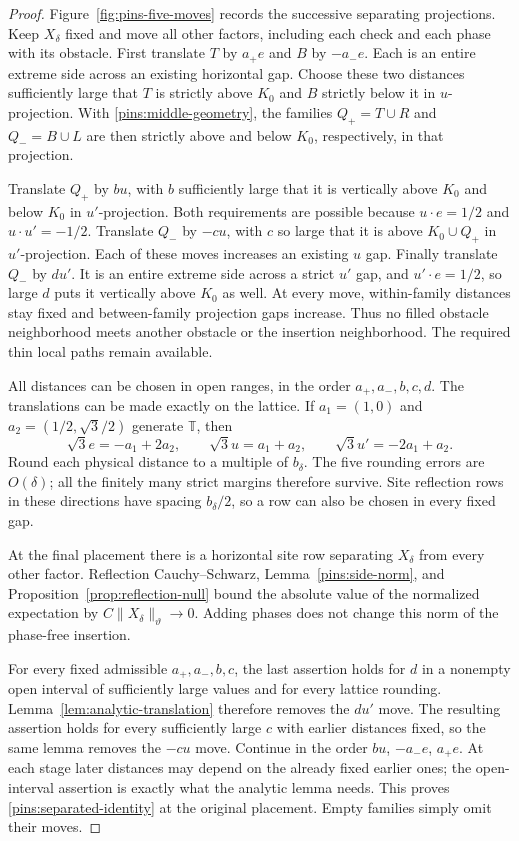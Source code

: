 \documentclass[11pt]{article}
\newcommand{\T}{\mathbb T}
\theoremstyle{definition}
\theoremstyle{remark}
\numberwithin{equation}{section}
\begin{document}
\begin{proof}
Figure~\ref{fig:pins-five-moves} records the successive separating
projections.  Keep $X_\delta$ fixed and move all other factors, including
each check and each phase with its obstacle.  First translate $T$ by $a_+e$ and
$B$ by $-a_-e$.  Each is an entire extreme side across an existing
horizontal gap.  Choose these two distances sufficiently large that
$T$ is strictly above $K_0$ and $B$ strictly below it in
$u$-projection.  With \eqref{pins:middle-geometry}, the families
$Q_+=T\cup R$ and $Q_-=B\cup L$ are then strictly above and below
$K_0$, respectively, in that projection.

Translate $Q_+$ by $bu$, with $b$ sufficiently large that it is
vertically above $K_0$ and below $K_0$ in $u'$-projection.  Both
requirements are possible because
$u\cdot e=1/2$ and $u\cdot u'=-1/2$.  Translate $Q_-$ by $-cu$,
with $c$ so large that it is above $K_0\cup Q_+$ in
$u'$-projection.  Each of these moves increases an existing $u$ gap.
Finally translate $Q_-$ by $du'$.  It is an entire extreme side
across a strict $u'$ gap, and $u'\cdot e=1/2$, so large $d$ puts
it vertically above $K_0$ as well.  At every move, within-family
distances stay fixed and between-family projection gaps increase.
Thus no filled obstacle neighborhood meets another obstacle or the
insertion neighborhood.  The required thin local paths remain available.

All distances can be chosen in open ranges, in the order
$a_+,a_-,b,c,d$.  The translations can be made exactly on the lattice.
If $a_1=(1,0)$ and $a_2=(1/2,\sqrt3/2)$ generate $\T$, then
\[
 \sqrt3 e=-a_1+2a_2,\qquad
 \sqrt3 u=a_1+a_2,\qquad
 \sqrt3 u'=-2a_1+a_2.
\]
Round each physical distance to a multiple of $b_\delta$.  The five
rounding errors are $O(\delta)$; all the finitely many strict margins
therefore survive.  Site reflection rows in these directions have
spacing $b_\delta/2$, so a row can also be chosen in every fixed gap.

At the final placement there is a horizontal site row separating
$X_\delta$ from every other factor.  Reflection Cauchy--Schwarz,
Lemma~\ref{pins:side-norm}, and
Proposition~\ref{prop:reflection-null} bound the absolute value of
the normalized expectation by $C\|X_\delta\|_\vartheta\to0$.
Adding phases does not change this norm of the phase-free insertion.

For every fixed admissible $a_+,a_-,b,c$, the last assertion holds
for $d$ in a nonempty open interval of sufficiently large values and
for every lattice rounding.  Lemma~\ref{lem:analytic-translation}
therefore removes the $du'$ move.  The resulting assertion holds for
every sufficiently large $c$ with earlier distances fixed, so the same
lemma removes the $-cu$ move.  Continue in the order $bu$, $-a_-e$,
$a_+e$.  At each stage later distances may depend on the already fixed
earlier ones; the open-interval assertion is exactly what the analytic
lemma needs.  This proves \eqref{pins:separated-identity} at the original
placement.  Empty families simply omit their moves.
\end{proof}
\end{document}
